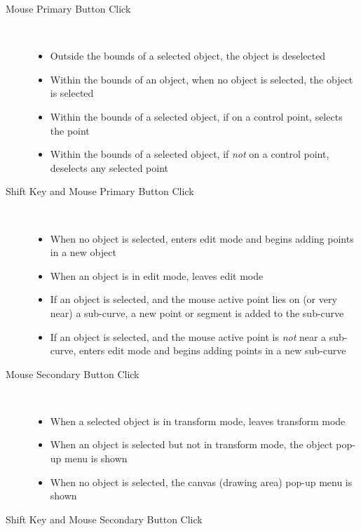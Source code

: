 		\begin{description}
		  \item[Mouse Primary Button Click] \hfill \\
		    \begin{itemize}
		      \item Outside the bounds of a selected object, the
		        object is deselected
		      \item Within the bounds of an object, when no object
		        is selected, the object is selected
		      \item Within the bounds of a selected object,
		        if on a control point, selects the point
		      \item Within the bounds of a selected object,
		        if \emph{not} on a control point,
		        deselects any selected point
		    \end{itemize}
		  \item[Shift Key and Mouse Primary Button Click] \hfill \\
		    \begin{itemize}
		      \item When no
		        object is selected, enters edit mode and
		        begins adding points in a
		        new object
		      \item When an
		        object is in edit mode,
		        leaves edit mode
		      \item If an object is selected, and the mouse active
		        point lies on (or very near) a sub-curve, a
		        new point or segment is added to the sub-curve
		      \item If an object is selected, and the mouse active
		        point is \emph{not} near a sub-curve, enters edit mode
		        and begins adding points in a new sub-curve
		    \end{itemize}
		  \item[Mouse Secondary Button Click] \hfill \\
		    \begin{itemize}
		      \item When a selected object is in transform mode,
		        leaves transform mode
		      \item When an object is selected but not in
		        transform mode, the object pop-up menu is shown
		      \item When no object is selected,
		        the canvas (drawing area) pop-up menu is shown
		    \end{itemize}
		  \item[Shift Key and Mouse Secondary Button Click] \hfill \\

\end{description}
